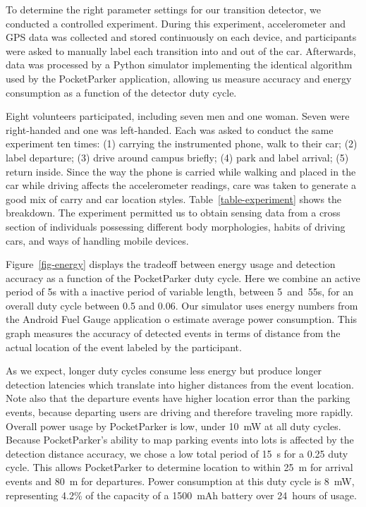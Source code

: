 

To determine the right parameter settings for our transition detector, we
conducted a controlled experiment. During this experiment, accelerometer and
GPS data was collected and stored continuously on each device, and
participants were asked to manually label each transition into and out of the
car. Afterwards, data was processed by a Python simulator implementing the
identical algorithm used by the PocketParker application, allowing us measure
accuracy and energy consumption as a function of the detector duty cycle.

Eight volunteers participated, including seven men and one woman. Seven were
right-handed and one was left-handed. Each was asked to conduct the same
experiment ten times: (1) carrying the instrumented phone, walk to their car;
(2) label departure; (3) drive around campus briefly; (4) park and label
arrival; (5) return inside. Since the way the phone is carried while walking
and placed in the car while driving affects the accelerometer readings, care
was taken to generate a good mix of carry and car location styles.
Table~\ref{table-experiment} shows the breakdown. The experiment permitted us
to obtain sensing data from a cross section of individuals possessing
different body morphologies, habits of driving cars, and ways of handling
mobile devices.

Figure~\ref{fig-energy} displays the tradeoff between energy usage and
detection accuracy as a function of the PocketParker duty cycle. Here we
combine an active period of 5s with a inactive period of variable length,
between 5~and~55s, for an overall duty cycle between 0.5 and 0.06. Our
simulator uses energy numbers from the Android Fuel Gauge application
o estimate average power consumption.  This graph measures the accuracy of
detected events in terms of distance from the actual location of the event
labeled by the participant.

As we expect, longer duty cycles consume less energy but produce longer
detection latencies which translate into higher distances from the event
location. Note also that the departure events have higher location error than
the parking events, because departing users are driving and therefore
traveling more rapidly. Overall power usage by PocketParker is low, under
10~mW at all duty cycles. Because PocketParker's ability to map parking
events into lots is affected by the detection distance accuracy, we chose a
low total period of 15~s for a 0.25 duty cycle. This allows PocketParker to
determine location to within 25~m for arrival events and 80~m for departures.
Power consumption at this duty cycle is 8~mW, representing 4.2\% of the
capacity of a 1500~mAh battery over 24~hours of usage.

